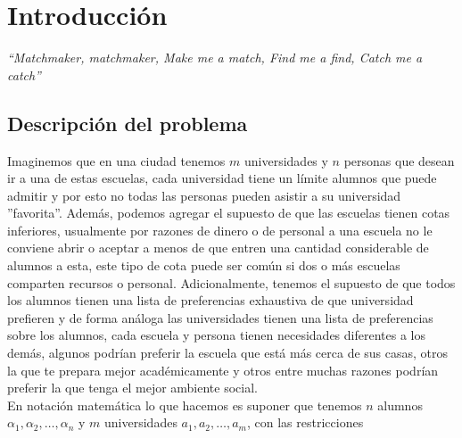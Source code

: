 \chapter{Introducción}
\begin{flushright}
\textit{``Matchmaker, matchmaker,
Make me a match, Find me a find,
Catch me a catch''}
\end{flushright}
\section{Descripción del problema}
Imaginemos que en una ciudad tenemos $m$ universidades y $n$ personas que desean ir a una de estas escuelas, cada universidad tiene un límite alumnos que puede admitir y por esto no todas las personas pueden asistir a su universidad ''favorita''. Además, podemos agregar el supuesto de que las escuelas tienen cotas inferiores, usualmente por razones de dinero o de personal a una escuela no le conviene abrir o aceptar a menos de que entren una cantidad considerable de alumnos a esta, este tipo de cota puede ser común si dos o más escuelas comparten recursos o personal. Adicionalmente, tenemos el supuesto de que todos los alumnos tienen una lista de preferencias exhaustiva de que universidad prefieren y de forma análoga las universidades tienen una lista de preferencias sobre los alumnos, cada escuela y persona tienen necesidades diferentes a los demás, algunos podrían preferir la escuela que está más cerca de sus casas, otros la que te prepara mejor académicamente y otros entre muchas razones podrían preferir la que tenga el mejor ambiente social. 
\\ En notación matemática lo que hacemos es suponer que tenemos $n$ alumnos $\alpha_1, \alpha_2, \ldots, \alpha_n$ y $m$ universidades $a_1, a_2, \ldots, a_m$, con las restricciones 

